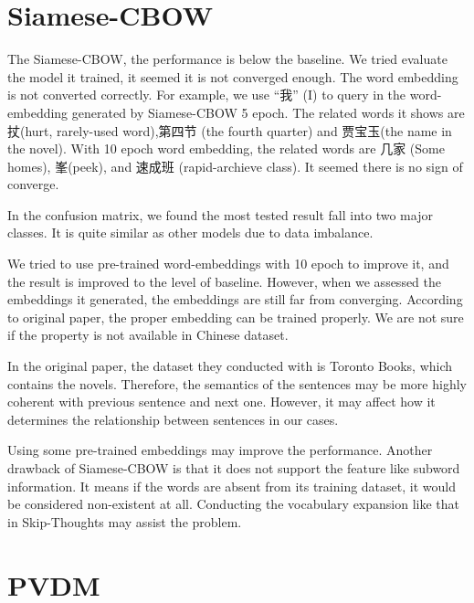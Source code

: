 \section{Siamese-CBOW}

\begin{CJK}{UTF8}{gbsn}
The Siamese-CBOW, the performance is below the baseline. We tried evaluate the model it trained, it seemed it is not converged enough. 
The word embedding is not converted correctly. For example, we use \enquote{我} (I) to query in the word-embedding generated by Siamese-CBOW 5 epoch. 
The related words it shows are 扙(hurt, rarely-used word),第四节 (the fourth quarter) and 贾宝玉(the name in the novel). 
With 10 epoch word embedding, the related words are 几家 (Some homes), 峯(peek), and 速成班 (rapid-archieve class). It seemed there is no sign of converge.
\end{CJK}

In the confusion matrix, we found the most tested result fall into two major classes.
It is quite similar as other models due to data imbalance.

We tried to use pre-trained word-embeddings with 10 epoch to improve it, and the result is improved to the level of baseline.
However, when we assessed the embeddings it generated, the embeddings are still far from converging. 
According to original paper, the proper embedding can be trained properly. 
We are not sure if the property is not available in Chinese dataset.

In the original paper, the dataset they conducted with is Toronto Books, which contains the novels.
Therefore, the semantics of the sentences may be more highly coherent with previous sentence and next one. 
However, it may affect how it determines the relationship between sentences in our cases.

Using some pre-trained embeddings may improve the performance. 
Another drawback of Siamese-CBOW is that it does not support the feature like subword information.
It means if the words are absent from its training dataset, it would be considered non-existent at all. Conducting the vocabulary expansion like that in Skip-Thoughts may assist the problem.


\section{PVDM}

